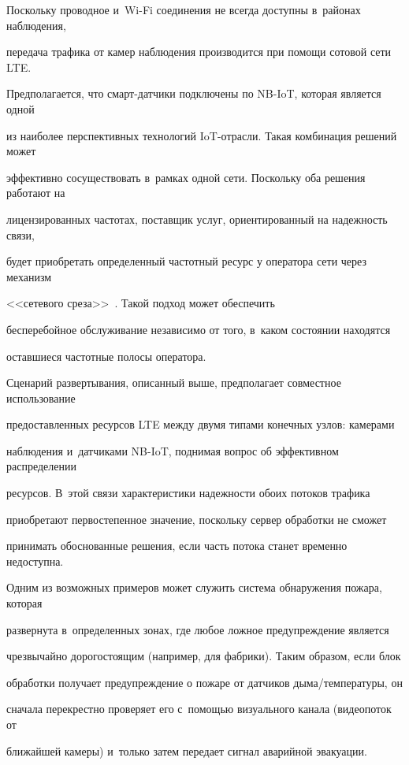 Поскольку проводное и~Wi-Fi соединения не всегда доступны в~районах наблюдения, 


передача трафика от камер наблюдения производится при помощи сотовой сети LTE. 


Предполагается, что смарт-дат\-чи\-ки подключены по NB-IoT, которая является одной 


из наиболее перспективных технологий IoT-от\-рас\-ли. Такая комбинация решений может 


эффективно сосуществовать в~рамках одной сети. Поскольку оба решения работают на 


лицензированных частотах, поставщик услуг, ориентированный на надежность связи, 


будет приобретать определенный частотный ресурс у оператора сети через механизм 


<<сетевого среза>>~\cite{nokia_network_slicing}. Такой подход может обеспечить 


бесперебойное обслуживание независимо от того, в~каком состоянии находятся 


оставшиеся частотные полосы оператора.





Сценарий развертывания, описанный выше, предполагает совместное использование 


предоставленных ресурсов LTE между двумя типами конечных узлов: камерами 


наблюдения и~датчиками NB-IoT, поднимая вопрос об эффективном распределении 


ресурсов. В~этой связи характеристики надежности обоих потоков трафика 


приобретают первостепенное значение, поскольку сервер обработки не сможет 


принимать обоснованные решения, если часть потока станет временно недоступна. 


Одним из возможных примеров может служить система обнаружения пожара, которая 


развернута в~определенных зонах, где любое ложное предупреждение является 


чрезвычайно дорогостоящим (например, для фабрики). Таким образом, если блок 


обработки получает предупреждение о пожаре от датчиков ды\-ма\!/\!тем\-пе\-ра\-ту\-ры, он 


сначала перекрестно проверяет его с~помощью визуального канала (видеопоток от 


ближайшей камеры) и~только затем передает сигнал аварийной эвакуации.





